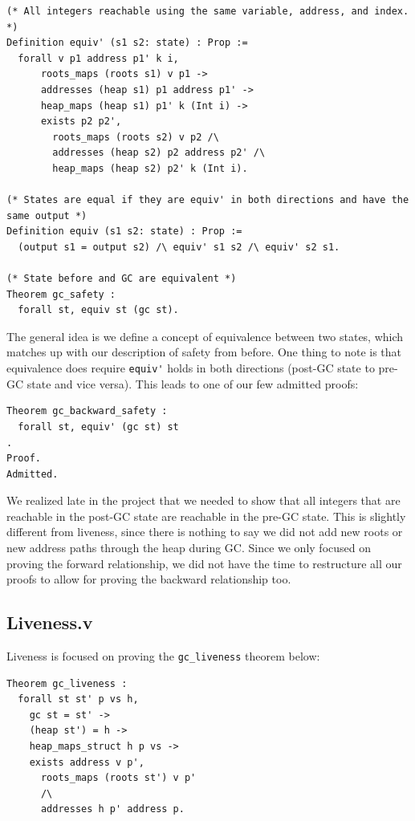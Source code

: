 \documentclass{article}
\begin{document}
\begin{lstlisting}
(* All integers reachable using the same variable, address, and index. *)
Definition equiv' (s1 s2: state) : Prop :=
  forall v p1 address p1' k i,
      roots_maps (roots s1) v p1 ->
      addresses (heap s1) p1 address p1' ->
      heap_maps (heap s1) p1' k (Int i) ->
      exists p2 p2',
        roots_maps (roots s2) v p2 /\
        addresses (heap s2) p2 address p2' /\
        heap_maps (heap s2) p2' k (Int i).

(* States are equal if they are equiv' in both directions and have the same output *)
Definition equiv (s1 s2: state) : Prop :=
  (output s1 = output s2) /\ equiv' s1 s2 /\ equiv' s2 s1.

(* State before and GC are equivalent *)
Theorem gc_safety :
  forall st, equiv st (gc st).
\end{lstlisting}

The general idea is we define a concept of equivalence between two states, which matches up with our description of safety from before. One thing to note is that equivalence does require \lstinline|equiv'| holds in both directions (post-GC state to pre-GC state and vice versa). This leads to one of our few admitted proofs:

\begin{lstlisting}
Theorem gc_backward_safety :
  forall st, equiv' (gc st) st
.
Proof.
Admitted.
\end{lstlisting}

We realized late in the project that we needed to show that all integers that are reachable in the post-GC state are reachable in the pre-GC state. This is slightly different from liveness, since there is nothing to say we did not add new roots or new address paths through the heap during GC. Since we only focused on proving the forward relationship, we did not have the time to restructure all our proofs to allow for proving the backward relationship too.

\subsection{Liveness.v}
Liveness is focused on proving the \lstinline|gc_liveness| theorem below:

\begin{lstlisting}
Theorem gc_liveness :
  forall st st' p vs h,
    gc st = st' ->
    (heap st') = h ->
    heap_maps_struct h p vs ->
    exists address v p',
      roots_maps (roots st') v p'
      /\
      addresses h p' address p.
\end{lstlisting}
\end{document}
